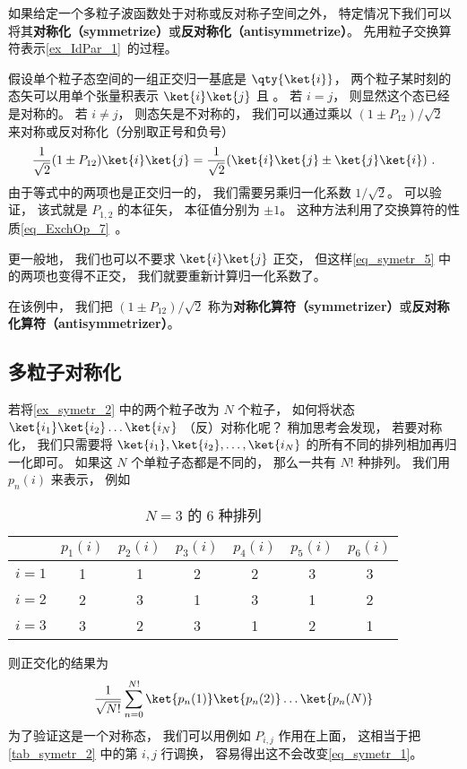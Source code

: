 

如果给定一个多粒子波函数处于对称或反对称子空间之外， 特定情况下我们可以将其\textbf{对称化（symmetrize）}或\textbf{反对称化（antisymmetrize）}。 先用粒子交换算符表示\autoref{ex_IdPar_1}~的过程。

\begin{example}{}\label{ex_symetr_2}
假设单个粒子态空间的一组正交归一基底是 $\qty{\ket{i}}$， 两个粒子某时刻的态矢可以用单个张量积表示 $\ket{i}\ket{j}$ 且 。 若 $i = j$， 则显然这个态已经是对称的。  若 $i \ne j$， 则态矢是不对称的， 我们可以通过乘以 $(1 \pm P_{12})/\sqrt{2}$ 来对称或反对称化（分别取正号和负号）
\begin{equation}\label{eq_symetr_5}
\frac{1}{\sqrt{2}}(1 \pm P_{12})\ket{i}\ket{j} = \frac{1}{\sqrt{2}}(\ket{i}\ket{j} \pm \ket{j}\ket{i})~.
\end{equation}
由于等式中的两项也是正交归一的， 我们需要另乘归一化系数 $1/\sqrt 2$。 可以验证， 该式就是 $P_{1,2}$ 的本征矢， 本征值分别为 $\pm 1$。 这种方法利用了交换算符的性质\autoref{eq_ExchOp_7}~。

更一般地， 我们也可以不要求 $\ket{i}\ket{j}$ 正交， 但这样\autoref{eq_symetr_5} 中的两项也变得不正交， 我们就要重新计算归一化系数了。
\end{example}

在该例中， 我们把 $(1 \pm P_{12})/\sqrt{2}$ 称为\textbf{对称化算符（symmetrizer）}或\textbf{反对称化算符（antisymmetrizer）}。

\subsection{多粒子对称化}
若将\autoref{ex_symetr_2} 中的两个粒子改为 $N$ 个粒子， 如何将状态 $\ket{i_1}\ket{i_2}\dots\ket{i_N}$ （反）对称化呢？ 稍加思考会发现， 若要对称化， 我们只需要将 $\ket{i_1},\ket{i_2},\dots,\ket{i_N}$ 的所有不同的排列相加再归一化即可。 如果这 $N$ 个单粒子态都是不同的， 那么一共有 $N!$ 种排列。 我们用 $p_n(i)$ 来表示， 例如
\begin{table}[ht]
\centering
\caption{$N = 3$ 的 6 种排列}\label{tab_symetr_2}
\begin{tabular}{|c|c|c|c|c|c|c|}
\hline
  & $p_1(i)$ & $p_2(i)$ & $p_3(i)$ & $p_4(i)$ & $p_5(i)$ & $p_6(i)$ \\
\hline
$i=1$ & 1 & 1 & 2 & 2 & 3 & 3 \\
\hline
$i=2$ & 2 & 3 & 1 & 3 & 1 & 2 \\
\hline
$i=3$ & 3 & 2 & 3 & 1 & 2 & 1 \\
\hline
\end{tabular}
\end{table}
则正交化的结果为
\begin{equation}\label{eq_symetr_1}
\frac{1}{\sqrt{N!}}\sum_{n = 0}^{N!} \ket{p_n(1)}\ket{p_n(2)}\dots\ket{p_n(N)}
\end{equation}
为了验证这是一个对称态， 我们可以用例如 $P_{i,j}$ 作用在上面， 这相当于把\autoref{tab_symetr_2} 中的第 $i,j$ 行调换， 容易得出这不会改变\autoref{eq_symetr_1}。

